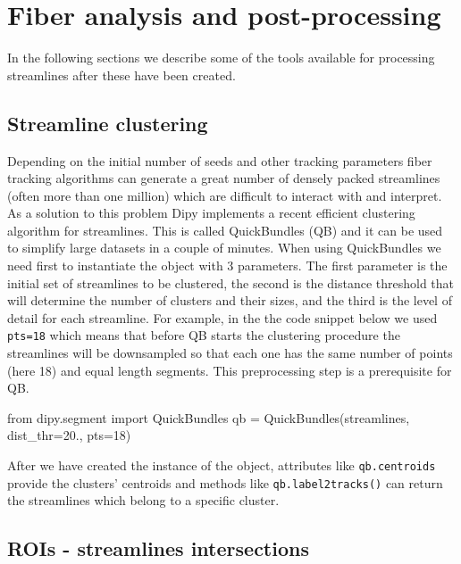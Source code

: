 \documentclass{bioinfo}
\begin{document}
\section{Fiber analysis and post-processing}\label{post_tracking}

In the following sections we describe some of the tools available for processing
streamlines after these have been created.
\subsection{Streamline clustering}\label{quickbundles}
Depending on the initial number of seeds and other tracking parameters
fiber tracking algorithms can generate a great number of densely packed
streamlines (often more than one million) which are difficult to interact with
and interpret. As a solution to this problem Dipy implements a recent
efficient clustering algorithm for streamlines. This is called QuickBundles (QB)
\citep{Garyfallidis_thesis,garyfallidis-etal:12} and it can be used to
simplify large datasets in a couple of minutes.
When using QuickBundles we need first to instantiate the object with 3
parameters. The first parameter is the initial set of streamlines to be
clustered, the second is the distance threshold that will determine the number of clusters and their sizes,
and the third is the level of detail for each streamline. For example, in the
the code snippet below we used \texttt{pts=18} which means that before QB
starts the clustering procedure the streamlines will be downsampled so that
each one has the same number of points (here 18) and equal length segments. This
preprocessing step is a prerequisite for QB.
\begin{python}
from dipy.segment import QuickBundles
qb = QuickBundles(streamlines, dist_thr=20.,
                  pts=18)
\end{python}
After we have created the instance of the object, attributes like
\texttt{qb.centroids} provide the clusters' centroids and methods like
\texttt{qb.label2tracks()} can return the streamlines which belong to a
specific cluster.

\subsection{ROIs - streamlines intersections}
\end{document}
